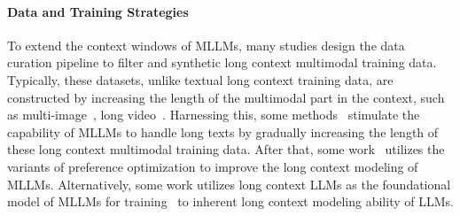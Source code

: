 \documentclass[11pt, a4paper, logo, copyright, nonumbering]{map}
\begin{document}
\paragraph{Data and Training Strategies} To extend the context windows of MLLMs, many studies design the data curation pipeline to filter and synthetic long context multimodal training data. Typically, these datasets, unlike textual long context training data, are constructed by increasing the length of the multimodal part in the context, such as multi-image~\citep{DBLP:journals/corr/abs-2411-19951}, long video~\citep{DBLP:journals/corr/abs-2406-14129,DBLP:journals/corr/abs-2501-00574}. Harnessing this, some methods~\citep{zhao-2024-arxiv-OmChat,li-2024-arxiv-llavaonevision,wang-2024-arxiv-LongLLaVA,hannan-2024-arxiv-revisionllm,zhang-2024-arxiv-intenlmxcomposer25,xue-2024-arxiv-LongVILA} stimulate the capability of MLLMs to handle long texts by gradually increasing the length of these long context multimodal training data. After that, some work~\citep{li-2025-arxiv-TPO} utilizes the variants of preference optimization to improve the long context modeling of MLLMs. Alternatively, some work utilizes long context LLMs as the foundational model of MLLMs for training~\citep{jang-2024-emnlp-mate} to inherent long context modeling ability of LLMs. 
\end{document}
